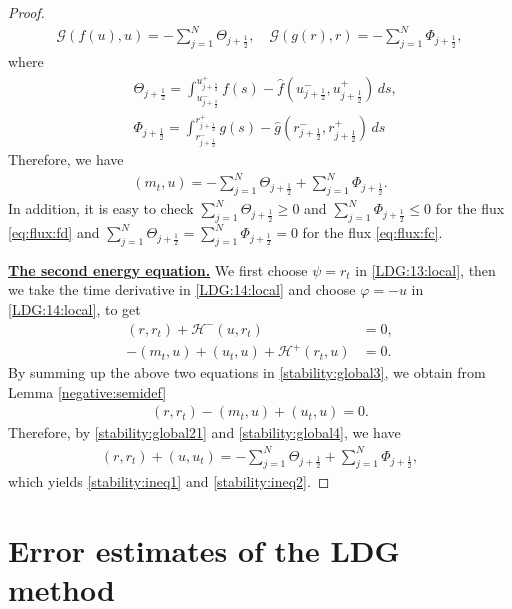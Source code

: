 \documentclass[11pt]{article}
\newcommand{\Hcal} {\mathcal{H}}
\newcommand{\Gcal} {\mathcal{G}}
\newcommand{\sumn}{\sum_{j=1}^N}
\numberwithin{equation}{section}
\newcommand{\jr}{j+\frac 12}
\begin{document}
\begin{proof}
\begin{align*}
\Gcal(f(u), u)=-\sumn\Theta_{\jr},\quad \Gcal(g(r), r)=-\sumn \Phi_{\jr},
\end{align*}
where
\begin{align*}
&\Theta_{\jr}=\int_{u^-_{\jr}}^{u^+_{\jr}}f(s)-\hat{f}(u_{\jr}^-,u_{\jr}^+)\,ds,\\
&\Phi_{\jr}=\int_{r^-_{\jr}}^{r^+_{\jr}}g(s)-\hat{g}(r_{\jr}^-,r_{\jr}^+)\,ds
\end{align*}
Therefore, we have
\begin{align}
(m_{t}, u)=-\sumn\Theta_{\jr}+\sumn\Phi_{\jr}. \label{stability:global21}
\end{align}
In addition, it is easy to check $\displaystyle\sumn\Theta_{\jr}\geq0$ and $\displaystyle\sumn\Phi_{\jr}\leq 0$ for the flux \eqref{eq:flux:fd}  and $\displaystyle\sumn\Theta_{\jr}=\displaystyle\sumn\Phi_{\jr}=0$ for the flux \eqref{eq:flux:fc}.

\noindent \underline{\textbf{The second energy equation.}}
We first choose $\psi=r_t$ in \eqref{LDG:13:local}, then we take the time derivative in \eqref{LDG:14:local} and choose $\varphi=-u$ in \eqref{LDG:14:local}, to get
\begin{subequations}\label{stability:global3}
		\begin{align}
			(r, r_t)+\Hcal^-(u, r_t)&=0,\label{stability:14:local}\\
			-(m_t, u)+(u_t, u)+\Hcal^+(r_t, u)&=0.\label{stability:15:local}
		\end{align}
\end{subequations}
By summing up the above two equations in \eqref{stability:global3}, we obtain from Lemma \ref{negative:semidef}
\begin{align}
			(r, r_t)-(m_t, u)+(u_t, u)=0.\label{stability:global4}
\end{align}
Therefore, by \eqref{stability:global21} and \eqref{stability:global4}, we have
\begin{align}
			(r, r_t)+(u, u_t)=-\sumn\Theta_{\jr}+\sumn\Phi_{\jr}, \label{stability:global5}
\end{align}
which yields \eqref{stability:ineq1} and \eqref{stability:ineq2}.
\end{proof}					
\section{Error estimates of the LDG method}
\label{sec4}
\setcounter{equation}{0}
\end{document}
